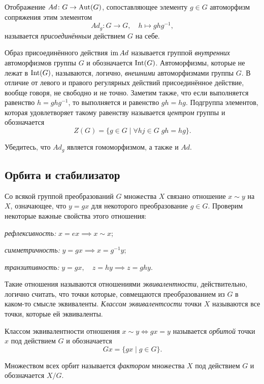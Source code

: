 \begin{example}
    Отображение $Ad \colon G \to \operatorname{Aut}(G)$, сопоставляющее элементу $g\in G$ автоморфизм сопряжения этим элементом \[Ad_g \colon G \to G, \quad h \mapsto ghg^{-1},\] называется \emph{присоединённым} действием $G$ на себе.


    Образ присоединённого действия $\operatorname{im} Ad$ называется группой \emph{внутренних} автоморфизмов группы $G$ и обозначается $\operatorname{Int}(G)$. Автоморфизмы, которые не лежат в $\operatorname{Int}(G)$, называются, логично, \emph{внешними} автоморфизмами группы $G$. В отличие от левого и правого регулярных действий присоединённое действие, вообще говоря, не свободно и не точно. Заметим также, что если выполняется равенство $h = ghg^{-1}$, то выполняется и равенство $gh = hg$. Подгруппа элементов, которая удовлетворяет такому равенству называется \emph{центром} группы и обозначается \[Z(G) = \{g \in G \mid \forall hj \in G\; gh=hg\}.\]
\end{example}
\begin{practice}
    Убедитесь, что $Ad_g$ является гомоморфизмом, а также и $Ad$.
\end{practice}

\subsection{Орбита и стабилизатор}
Со всякой группой преобразований $G$ множества $X$ связано отношение $x \sim y$ на $X$, означающее, что $y = gx$ для некоторого преобразование $g \in G$. Проверим некоторые важные свойства этого отношения: \begin{conditions} \item \emph{рефлексивность:} $x = ex \implies x \sim x$;
    \item \emph{симметричность:} $y = gx \implies x = g^{-1}y$;
    \item \emph{транзитивность:} $y = gx,\quad z = hy \implies z = ghy$.
\end{conditions}

Такие отношения называются отношениями \emph{эквивалентности}, действительно, логично считать, что точки которые, совмещаются преобразованием из $G$ в каком-то смысле эквиваленты. \emph{Классом эквивалентсости} точки $X$ называются все точки, которые ей эквиваленты. 
\begin{definition}[Орбита]
    Классом эквивалентности отношения $x \sim y \iff gx = y$ называется \emph{орбитой} точки $x$ под действием $G$ и обозначается 
    \[Gx = \{gx \mid g \in G\}.\]

    Множеством всех орбит называется \emph{фактором} множества $X$ под действием $G$ и обозначается $X/G$.
\end{definition}

